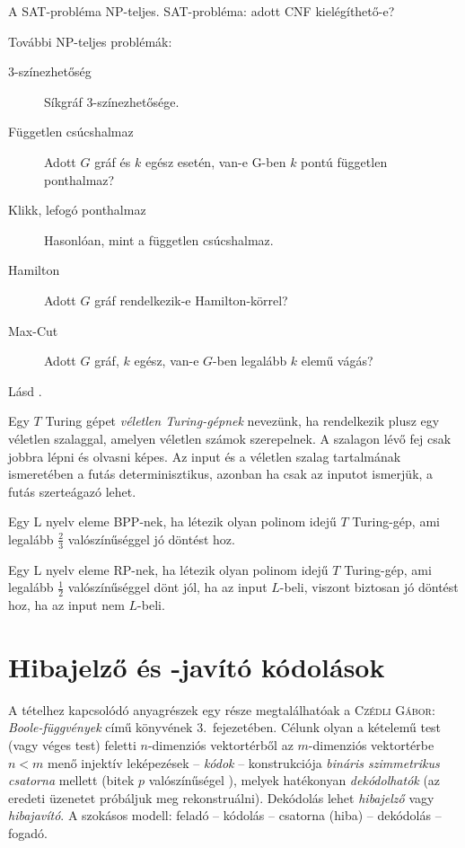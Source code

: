 \documentclass[DIV=15,appendixprefix]{scrreprt}
\theoremstyle{definition}
\theoremstyle{remark}
\begin{document}
A SAT-probléma NP-teljes. SAT-probléma: adott CNF kielégíthető-e?

További NP-teljes problémák:
\begin{description}
	\item[3-színezhetőség] Síkgráf 3-színezhetősége.
	\item[Független csúcshalmaz] Adott $G$ gráf és $k$ egész esetén, van-e G-ben $k$ pontú független
		ponthalmaz?
	\item[Klikk, lefogó ponthalmaz] Hasonlóan, mint a független csúcshalmaz.
	\item[Hamilton] Adott $G$ gráf rendelkezik-e Hamilton-körrel?
	\item[Max-Cut] Adott $G$ gráf, $k$ egész, van-e $G$-ben legalább $k$ elemű vágás?
\end{description}
%
Lásd
\cite[\href{http://www.math.u-szeged.hu/~hajnal/courses/MSc_Bonyolultsag/ea10.pdf}{
\emph{Véletlen számítások, bonyolultsági osztályok}}]{Bonya}.

Egy $T$ Turing gépet \emph{véletlen Turing-gépnek} nevezünk, ha rendelkezik plusz egy véletlen
szalaggal, amelyen véletlen számok szerepelnek. A szalagon lévő fej csak jobbra lépni és olvasni
képes. Az input és a véletlen szalag tartalmának ismeretében a futás determinisztikus, azonban ha
csak az inputot ismerjük, a futás szerteágazó lehet.

Egy L nyelv eleme BPP-nek, ha létezik olyan polinom idejű $T$ Turing-gép, ami legalább
$\frac{ 2 }{ 3 }$ valószínűséggel jó döntést hoz.

Egy L nyelv eleme RP-nek, ha létezik olyan polinom idejű $T$ Turing-gép, ami legalább
$\frac{ 1 }{ 2 }$ valószínűséggel dönt jól, ha az input $L$-beli, viszont biztosan jó döntést hoz, ha az input nem $L$-beli.
%
\section{Hibajelző és -javító kódolások}
A tételhez kapcsolódó anyagrészek egy része megtalálhatóak a \textsc{Czédli Gábor}:
\emph{Boole-függvények} \cite{Czedli} című könyvének 3.~fejezetében.
%
Célunk olyan a kételemű test (vagy véges test) feletti $ n $-dimenziós vektortérből az
$ m $-dimenziós vektortérbe
$ n < m $ menő injektív leképezések -- \emph{kódok} -- konstrukciója \emph{bináris
szimmetrikus csatorna} mellett (bitek $ p $ valószínűségel ), melyek hatékonyan
\emph{dekódolhatók} (az eredeti üzenetet próbáljuk meg rekonstruálni). Dekódolás lehet
\emph{hibajelző} vagy \emph{hibajavító}. A szokásos modell: feladó -- kódolás -- csatorna (hiba) --
dekódolás -- fogadó.
\end{document}
